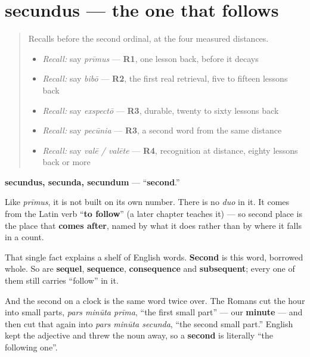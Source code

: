 \section[secundus, secunda, secundum]{secundus — the one that follows}

\label{lesson:LA-C55-secundus}



\begin{quote}
Recalls before the second ordinal, at the four measured distances.

\begin{itemize}
\raggedright
  \item \emph{Recall:} say \emph{prīmus} — \textbf{R1}, one lesson back, before it decays
  \item \emph{Recall:} say \emph{bibō} — \textbf{R2}, the first real retrieval, five to fifteen lessons back
  \item \emph{Recall:} say \emph{exspectō} — \textbf{R3}, durable, twenty to sixty lessons back
  \item \emph{Recall:} say \emph{pecūnia} — \textbf{R3}, a second word from the same distance
  \item \emph{Recall:} say \emph{valē / valēte} — \textbf{R4}, recognition at distance, eighty lessons back or more
\end{itemize}
\end{quote}

\begin{cousinweb}
\textbf{secundus, secunda, secundum} — \textquotedblleft{}\textbf{second}.\textquotedblright{}

Like \emph{prīmus}, it is not built on its own number. There is no \emph{duo} in it. It comes from the Latin verb \textquotedblleft{}\textbf{to follow}\textquotedblright{} (a later chapter teaches it) — so second place is the place that \textbf{comes after}, named by what it does rather than by where it falls in a count.

That single fact explains a shelf of English words. \textbf{Second} is this word, borrowed whole. So are \textbf{sequel}, \textbf{sequence}, \textbf{consequence} and \textbf{subsequent}; every one of them still carries \textquotedblleft{}follow\textquotedblright{} in it.

And the second on a clock is the same word twice over. The Romans cut the hour into small parts, \emph{pars minūta prīma}, \textquotedblleft{}the first small part\textquotedblright{} — our \textbf{minute} — and then cut that again into \emph{pars minūta secunda}, \textquotedblleft{}the second small part.\textquotedblright{} English kept the adjective and threw the noun away, so a \textbf{second} is literally \textquotedblleft{}the following one\textquotedblright{}.
\end{cousinweb}

